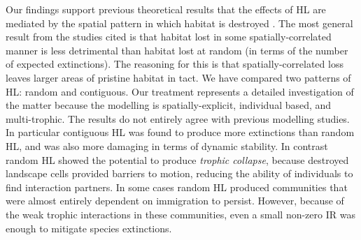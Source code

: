 Our findings support previous theoretical results that the effects of HL are mediated by the spatial pattern in which habitat is destroyed \cite{allen2007self,jager2006simulated,dytham1995effect,
hill1999habitat,travis2003climate,with1999extinction,ovaskainen2002metapopulation}. The most general result from the studies cited is that habitat lost in some spatially-correlated manner is less detrimental than habitat lost at random (in terms of the number of expected extinctions). The reasoning for this is that spatially-correlated loss leaves larger areas of pristine habitat in tact. We have compared two patterns of HL: random and contiguous. Our treatment represents a detailed investigation of the matter because the modelling is spatially-explicit, individual based, and multi-trophic. The results do not entirely agree with previous modelling studies. In particular contiguous HL was found to produce more extinctions than random HL, and was also more damaging in terms of dynamic stability. In contrast random HL showed the potential to produce \emph{trophic collapse}, because destroyed landscape cells provided barriers to motion, reducing the ability of individuals to find interaction partners. In some cases random HL produced communities that were almost entirely dependent on immigration to persist. However, because of the weak trophic interactions in these communities, even a small non-zero IR was enough to mitigate species extinctions. 

